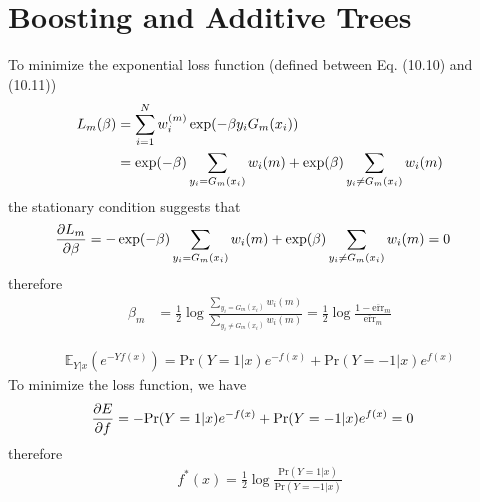 \chapter{Boosting and Additive Trees}
\label{ch:10}

\begin{exercise}
  To minimize the exponential loss function (defined between Eq. (10.10) and
  (10.11))
  \begin{align}
    L_m(\beta) &= \sum_{i=1}^Nw_i^{(m)}\exp(-\beta y_iG_m(x_i)) \notag\\
    &= \exp(-\beta)\sum_{y_i=G_m(x_i)}w_i{(m)} +
    \exp(\beta)\sum_{y_i\not=G_m(x_i)}w_i{(m)}
  \end{align}
  the stationary condition suggests that
  \begin{align}
    \pdv{L_m}{\beta} &= -\exp(-\beta)\sum_{y_i=G_m(x_i)}w_i{(m)} +
    \exp(\beta)\sum_{y_i\not=G_m(x_i)}w_i{(m)}=0
  \end{align}
  therefore
  \begin{align}
    \beta_m &= \frac{1}{2}\log\frac{\sum_{y_i=G_m(x_i)}w_i{(m)}}
    {\sum_{y_i\not=G_m(x_i)}w_i{(m)} } =
    \frac{1}{2}\log\frac{1-\overline{\mbox{err}}_m} {\overline{\mbox{err}}_m}
  \end{align}
\end{exercise}

\begin{exercise}
  \begin{align}
    \mathbb{E}_{Y|x} \left(e^{-Yf(x)}\right) = \mbox{Pr}(Y=1|x)e^{-f(x)} +
    \mbox{Pr}(Y=-1|x)e^{f(x)}
  \end{align}
  To minimize the loss function, we have
  \begin{align}
    \pdv{E}{f} &= -\mbox{Pr}(Y=1|x)e^{-f(x)} +
    \mbox{Pr}(Y=-1|x)e^{f(x)} = 0
  \end{align}
  therefore
  \begin{align}
    f^*(x) = \frac{1}{2}\log\frac{\mbox{Pr}(Y=1|x)}{\mbox{Pr}(Y=-1|x)}
  \end{align}
\end{exercise}

